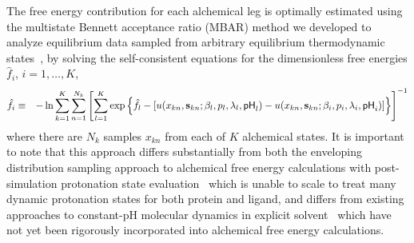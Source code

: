\documentclass[11pt]{article}
\begin{document}
The free energy contribution for each alchemical leg is optimally estimated using the multistate Bennett acceptance ratio (MBAR) method we developed to analyze equilibrium data sampled from arbitrary equilibrium thermodynamic states~\cite{shirts-chodera:jcp:2008:mbar}, by solving the self-consistent equations for the dimensionless free energies $\hat{f}_i$, $i = 1,\ldots,K$,
\begin{eqnarray}
\hat{f}_i &\equiv& - \ln \sum_{k=1}^K \sum_{n=1}^{N_k} \left[ \sum_{l=1}^K \exp\left\{\hat{f}_l - [u(x_{kn}, {\bf s}_{kn}; \beta_l, p_l, \lambda_l, \mathsf{pH}_l) - u(x_{kn}, {\bf s}_{kn}; \beta_i, p_i, \lambda_i, \mathsf{pH}_i)]\right\}  \right]^{-1} \label{equation:mbar}
\end{eqnarray}
where there are $N_k$ samples $x_{kn}$ from each of $K$ alchemical states.
It is important to note that this approach differs substantially from both the enveloping distribution sampling approach to alchemical free energy calculations with post-simulation protonation state evaluation~\cite{brooks:protein-sci:2016:constant-pH-free-energy} which is unable to scale to treat many dynamic protonation states for both protein and ligand, and differs from existing approaches to constant-pH molecular dynamics in explicit solvent~\cite{stern:jcp:2007:constant-pH,grubmueller:biophys-j:2011:constant-pH-lambda-dynamics,brooks:proteins:2014:constant-ph-explicit,roux:jctc:2015:constant-pH-ncmc} which have not yet been rigorously incorporated into alchemical free energy calculations.

\end{document}
